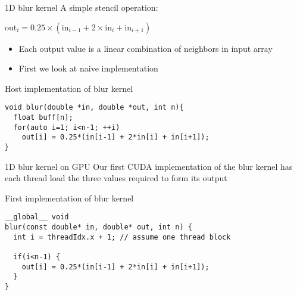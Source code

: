 \documentclass[aspectratio=43]{beamer}
\begin{document}
\begin{frame}[fragile]{1D blur kernel}
    A simple stencil operation:

    \centering $\text{out}_i = 0.25\times(\text{in}_{i-1}+2\times\text{in}_i+\text{in}_{i+1})$
    \smallskip

    \begin{itemize}
        \item Each output value is a linear combination of neighbors in input array
        \item First we look at naive implementation
    \end{itemize}

    \begin{code}{Host implementation of blur kernel}
        \begin{lstlisting}[style=boxcudatiny]
void blur(double *in, double *out, int n){
  float buff[n];
  for(auto i=1; i<n-1; ++i)
    out[i] = 0.25*(in[i-1] + 2*in[i] + in[i+1]);
}
        \end{lstlisting}
    \end{code}

\end{frame}

\begin{frame}[fragile]{1D blur kernel on GPU}
    Our first CUDA implementation of the blur kernel has each thread load the three values required to form its output\\
    
    \begin{code}{First implementation of blur kernel}
        \begin{lstlisting}[style=boxcudatiny]
__global__ void
blur(const double* in, double* out, int n) {
  int i = threadIdx.x + 1; // assume one thread block

  if(i<n-1) {
    out[i] = 0.25*(in[i-1] + 2*in[i] + in[i+1]);
  }
}
        \end{lstlisting}
    \end{code}

\end{frame}
\end{document}

